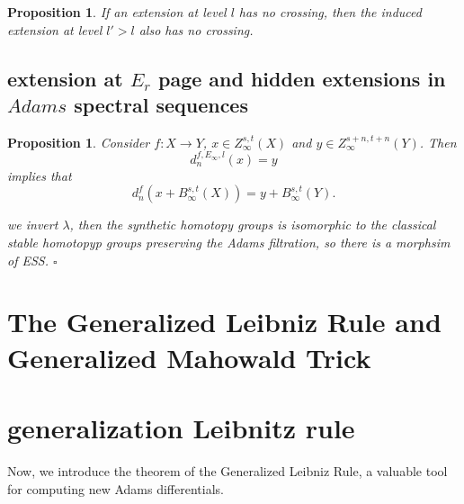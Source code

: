 \documentclass[12pt,a4paper]{article}
\renewenvironment{proof}{{\noindent\it\textbf{Proof}}\quad\it}{\hfill$\square$}
\newtheorem{prop}[equation]{Proposition}
\newtheorem{proposition}[equation]{Proposition}
\begin{document}
\begin{sloppy}
\begin{prop}
    If an extension at level $l$ has no crossing, then the induced extension at level $l'>l$ also has no crossing.
\end{prop}

\subsection{extension at $E_r$ page and hidden extensions in $Adams$ spectral sequences}

\begin{proposition}
    Consider $f: X\to Y$, $x\in Z_\infty^{s,t}(X)$ and $y\in Z_\infty^{s+n,t+n}(Y)$.
    Then
    $$d^{f,E_\infty, l}_n(x)=y$$
    implies that
    $$d^{f}_n(x+B_\infty^{s,t}(X))=y+B_\infty^{s,t}(Y).$$
\end{proposition}
\begin{proof}
    we invert $\lambda$, then the synthetic homotopy groups is isomorphic to the classical stable homotopyp groups preserving the Adams filtration, so there is a morphsim of ESS.
\end{proof}


\section{The Generalized Leibniz Rule and Generalized Mahowald Trick} \label{sec:rules}

\section{generalization Leibnitz rule}
Now, we introduce the theorem of the Generalized Leibniz Rule, a valuable tool for computing new Adams differentials.



\end{sloppy}
\end{document}
